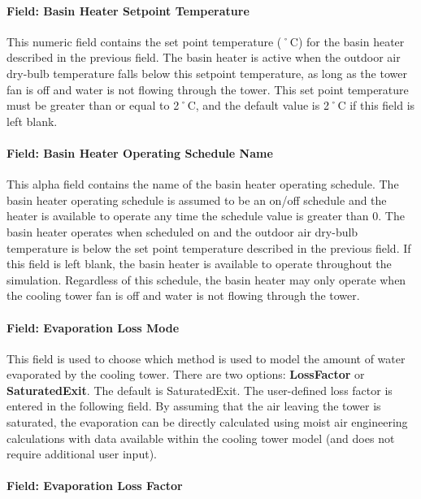 \paragraph{Field: Basin Heater Setpoint Temperature}\label{field-basin-heater-setpoint-temperature-2}

This numeric field contains the set point temperature (˚C) for the basin heater described in the previous field. The basin heater is active when the outdoor air dry-bulb temperature falls below this setpoint temperature, as long as the tower fan is off and water is not flowing through the tower. This set point temperature must be greater than or equal to 2˚C, and the default value is 2˚C if this field is left blank.

\paragraph{Field: Basin Heater Operating Schedule Name}\label{field-basin-heater-operating-schedule-name-2}

This alpha field contains the name of the basin heater operating schedule. The basin heater operating schedule is assumed to be an on/off schedule and the heater is available to operate any time the schedule value is greater than 0. The basin heater operates when scheduled on and the outdoor air dry-bulb temperature is below the set point temperature described in the previous field. If this field is left blank, the basin heater is available to operate throughout the simulation. Regardless of this schedule, the basin heater may only operate when the cooling tower fan is off and water is not flowing through the tower.

\paragraph{Field: Evaporation Loss Mode}\label{field-evaporation-loss-mode-2}

This field is used to choose which method is used to model the amount of water evaporated by the cooling tower. There are two options: \textbf{LossFactor} or \textbf{SaturatedExit}. The default is SaturatedExit. The user-defined loss factor is entered in the following field. By assuming that the air leaving the tower is saturated, the evaporation can be directly calculated using moist air engineering calculations with data available within the cooling tower model (and does not require additional user input).

\paragraph{Field: Evaporation Loss Factor}\label{field-evaporation-loss-factor-2}

